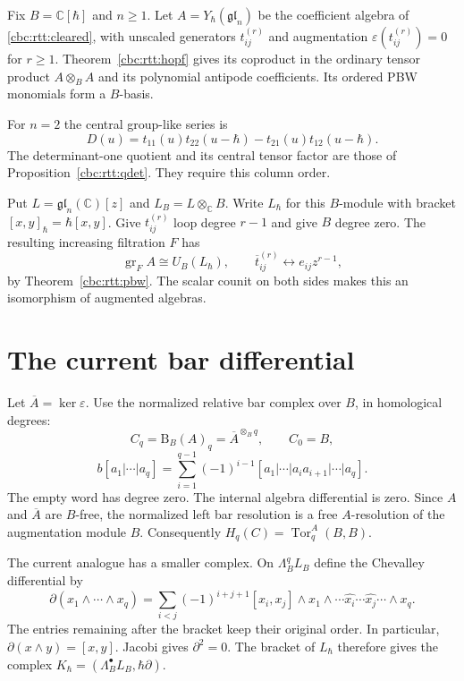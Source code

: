 Fix $B=\mathbb C[\hbar]$ and $n\geq1$.  Let
$A=Y_\hbar(\mathfrak{gl}_n)$ be the coefficient algebra of
\eqref{cbc:rtt:cleared}, with unscaled generators $t_{ij}^{(r)}$ and
augmentation $\varepsilon(t_{ij}^{(r)})=0$ for $r\geq1$.
Theorem~\ref{cbc:rtt:hopf} gives its coproduct in the ordinary tensor
product $A\otimes_B A$ and its polynomial antipode coefficients.
Its ordered PBW monomials form a $B$-basis.

For $n=2$ the central group-like series is
\[
 D(u)=t_{11}(u)t_{22}(u-\hbar)-t_{21}(u)t_{12}(u-\hbar).
\]
The determinant-one quotient and its central tensor factor are those of
Proposition~\ref{cbc:rtt:qdet}.  They require this column order.

Put $L=\mathfrak{gl}_n(\mathbb C)[z]$ and
$L_B=L\otimes_{\mathbb C}B$.  Write $L_\hbar$ for this $B$-module with
bracket $[x,y]_\hbar=\hbar[x,y]$.
Give $t_{ij}^{(r)}$ loop degree $r-1$ and give $B$ degree zero.
The resulting increasing filtration $F$ has
\begin{equation}\label{cbc:yangian:current}
 \operatorname{gr}_F A\cong U_B(L_\hbar),\qquad
 \overline t_{ij}^{(r)}\longleftrightarrow e_{ij}z^{r-1},
\end{equation}
by Theorem~\ref{cbc:rtt:pbw}.  The scalar counit on both sides makes
this an isomorphism of augmented algebras.

\section{The current bar differential}

Let $\overline A=\ker\varepsilon$.  Use the normalized relative bar
complex over $B$, in homological degrees:
\[
 C_q=\mathrm B_B(A)_q=\overline A^{\otimes_B q},\qquad C_0=B,
\]
\begin{equation}\label{cbc:yangian:bar-differential}
 b[a_1|\cdots|a_q]
 =\sum_{i=1}^{q-1}(-1)^{i-1}
       [a_1|\cdots|a_i a_{i+1}|\cdots|a_q].
\end{equation}
The empty word has degree zero.  The internal algebra differential is
zero.  Since $A$ and $\overline A$ are $B$-free, the normalized left bar
resolution is a free $A$-resolution of the augmentation module $B$.
Consequently $H_q(C)=\operatorname{Tor}^A_q(B,B)$.

The current analogue has a smaller complex.  On
$\Lambda_B^qL_B$ define the Chevalley differential by
\begin{equation}\label{cbc:yangian:chevalley}
 \partial(x_1\wedge\cdots\wedge x_q)
 =\sum_{i<j}(-1)^{i+j+1}[x_i,x_j]\wedge
 x_1\wedge\cdots\widehat{x_i}\cdots\widehat{x_j}\cdots\wedge x_q.
\end{equation}
The entries remaining after the bracket keep their original order.
In particular, $\partial(x\wedge y)=[x,y]$.
Jacobi gives $\partial^2=0$.
The bracket of $L_\hbar$ therefore gives the complex
$K_\hbar=(\Lambda_B^\bullet L_B,\hbar\partial)$.

